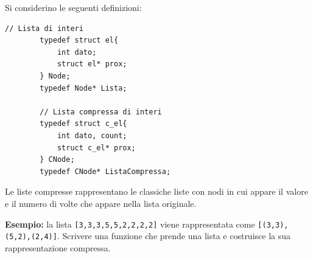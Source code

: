 \begin{Exercise}[label={ex:compressa}]
    Si considerino le seguenti definizioni:
    \begin{lstlisting}[style=cstylesmall]
        // Lista di interi
        typedef struct el{
            int dato;
            struct el* prox;
        } Node;
        typedef Node* Lista;

        // Lista compressa di interi
        typedef struct c_el{
            int dato, count;
            struct c_el* prox;
        } CNode;
        typedef CNode* ListaCompressa;
    \end{lstlisting}
    Le liste compresse rappresentano le classiche liste con nodi in cui appare il valore e il numero di volte che appare nella lista originale.
    
    \textbf{Esempio:} la lista \texttt{[3,3,3,5,5,2,2,2,2]} viene rappresentata come \texttt{[(3,3),(5,2),(2,4)]}.  
    Scrivere una funzione che prende una lista e costruisce la sua rappresentazione compressa.
\end{Exercise}

\begin{Answer}[ref={ex:compressa}]
  	
\end{Answer}